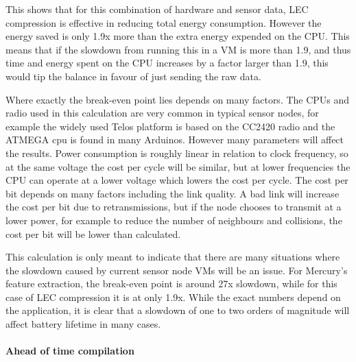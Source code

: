 This shows that for this combination of hardware and sensor data, LEC compression is effective in reducing total energy consumption. However the energy saved is only 1.9x more than the extra energy expended on the CPU. This means that if the slowdown from running this in a VM is more than 1.9, and thus time and energy spent on the CPU increases by a factor larger than 1.9, this would tip the balance in favour of just sending the raw data.

Where exactly the break-even point lies depends on many factors. The CPUs and radio used in this calculation are very common in typical sensor nodes, for example the widely used Telos platform \cite{Polastre:2005ut} is based on the CC2420 radio and the ATMEGA cpu is found in many Arduinos. However many parameters will affect the results. Power consumption is roughly linear in relation to clock frequency, so at the same voltage the cost per cycle will be similar, but at lower frequencies the CPU can operate at a lower voltage which lowers the cost per cycle. The cost per bit depends on many factors including the link quality. A bad link will increase the cost per bit due to retransmissions, but if the node chooses to transmit at a lower power, for example to reduce the number of neighbours and collisions, the cost per bit will be lower than calculated.

This calculation is only meant to indicate that there are many situations where the slowdown caused by current sensor node VMs will be an issue. For Mercury's feature extraction, the break-even point is around 27x slowdown, while for this case of LEC compression it is at only 1.9x. While the exact numbers depend on the application, it is clear that a slowdown of one to two orders of magnitude will affect battery lifetime in many cases.

\paragraph{Ahead of time compilation}

